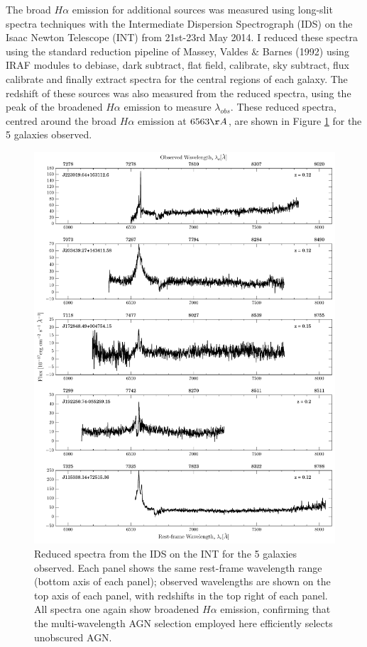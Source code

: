 The broad $H\alpha$ emission for  { additional sources} was measured using long-slit spectra techniques with the Intermediate Dispersion Spectrograph (IDS) on the Isaac Newton Telescope (INT) from 21st-23rd May 2014. I reduced these spectra using the standard reduction pipeline of Massey, Valdes \& Barnes (1992) using IRAF modules to debiase, dark subtract, flat field, calibrate, sky subtract, flux calibrate and finally extract spectra for the central regions of each galaxy. The redshift of these sources was also measured from the reduced spectra, using the peak of the broadened $H\alpha$ emission to measure $\lambda_{obs}$. These reduced spectra, centred around the broad $H\alpha$ emission at $6563\AA$, are shown in Figure \ref{fig:INTspectra} for the 5 galaxies observed.


\begin{figure}
\centering
\includegraphics[height=0.8\textheight]{agn/int_spectra.pdf}
\caption[Optical spectra of 5 bulgeless galaxies observed on the INT with the IDS]{Reduced spectra from the IDS on the INT for the 5 galaxies observed. Each panel shows the same rest-frame wavelength range (bottom axis of each panel); observed wavelengths are shown on the top axis of each panel, with redshifts in the top right of each panel. All spectra one again show broadened $H\alpha$ emission, confirming that the multi-wavelength AGN selection employed here efficiently selects unobscured AGN.}
\label{fig:INTspectra}
\end{figure}

